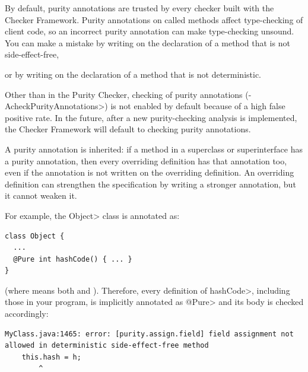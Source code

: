 
By default, purity annotations are trusted by every checker built with the
Checker Framework.  Purity annotations on called methods affect
type-checking of client code, so an incorrect purity annotation can make
type-checking unsound.  You can make a
mistake
%
by writing  on the
declaration of a method that is not side-effect-free,
%

or
%
by writing  on the
declaration of a method that is not deterministic.

Other than in the Purity Checker, checking of purity annotations
(\<-AcheckPurityAnnotations>) is not enabled by default because of a high
false positive rate.  In the future,
after a new purity-checking analysis is implemented, the Checker Framework
will default to checking purity annotations.



A purity annotation is inherited:  if a method in a superclass or
superinterface has a purity annotation, then every overriding definition has
that annotation too, even if the annotation is not written on the overriding
definition.  An overriding definition can strengthen the specification by
writing a stronger annotation, but it cannot weaken it.

For example, the \<Object> class is annotated as:

\begin{Verbatim}
class Object {
  ...
  @Pure int hashCode() { ... }
}
\end{Verbatim}

\noindent
(where  means both
 and
).  Therefore, every definition
of \<hashCode>, including those in your program, is implicitly annotated
as \<@Pure> and its body is checked accordingly:

\begin{mysmall}
\begin{Verbatim}
MyClass.java:1465: error: [purity.assign.field] field assignment not allowed in deterministic side-effect-free method
    this.hash = h;
        ^
\end{Verbatim}
\end{mysmall}

